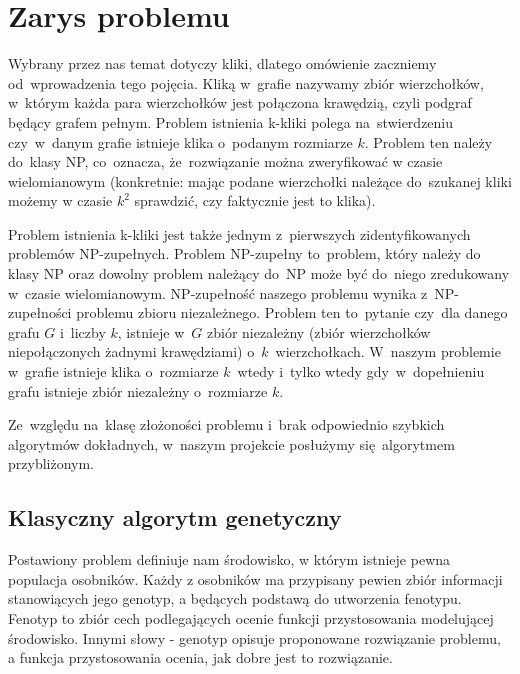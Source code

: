 \documentclass[11pt]{aghdpl}
\author{Wojciech Kasperek, Krzysztof Spytkowski, Izabela Śmietana}
\date{2014}
\begin{document}
\titlepages

\tableofcontents
\clearpage

\chapter{Zarys problemu}
\label{cha:zarys}


Wybrany przez nas temat dotyczy kliki, dlatego omówienie zaczniemy od~wprowadzenia tego pojęcia. 
Kliką w~grafie nazywamy zbiór wierzchołków, w~którym każda para wierzchołków jest połączona krawędzią, 
czyli podgraf będący grafem pełnym. Problem istnienia k-kliki polega na~stwierdzeniu 
czy~w~danym grafie istnieje klika o~podanym rozmiarze $k$. Problem ten należy do~klasy NP, co~oznacza, że~rozwiązanie 
można zweryfikować w czasie wielomianowym (konkretnie: mając podane wierzchołki należące do~szukanej
kliki możemy w czasie $k^2$ sprawdzić, czy faktycznie jest to klika).

Problem istnienia k-kliki jest także jednym z~pierwszych zidentyfikowanych problemów NP-zupełnych. 
Problem NP-zupełny to~problem, który należy do klasy NP oraz dowolny problem należący do~NP może być do~niego 
zredukowany w~czasie wielomianowym. NP-zupełność naszego problemu wynika z~NP-zupełności problemu 
zbioru niezależnego. Problem ten to~pytanie czy~dla danego grafu $G$ i~liczby $k$, istnieje w~$G$ zbiór 
niezależny (zbiór wierzchołków niepołączonych żadnymi krawędziami) o~$k$~wierzchołkach. W~naszym problemie 
w~grafie istnieje klika o~rozmiarze $k$~wtedy i~tylko wtedy gdy~w~dopełnieniu grafu istnieje zbiór niezależny 
o~rozmiarze $k$.

Ze~względu na~klasę złożoności problemu i~brak odpowiednio szybkich algorytmów dokładnych, w~naszym projekcie 
posłużymy się~algorytmem przybliżonym. 

\section{Klasyczny algorytm genetyczny}
\label{sec:algGenetyczne}
Postawiony problem definiuje nam środowisko, w którym istnieje pewna populacja osobników. Każdy z osobników ma 
przypisany pewien zbiór informacji stanowiących jego genotyp, a będących podstawą do utworzenia
fenotypu. Fenotyp to zbiór cech podlegających ocenie funkcji przystosowania modelującej środowisko.
Innymi słowy - genotyp opisuje proponowane rozwiązanie problemu, a funkcja przystosowania ocenia, jak
dobre jest to rozwiązanie.
\end{document}
